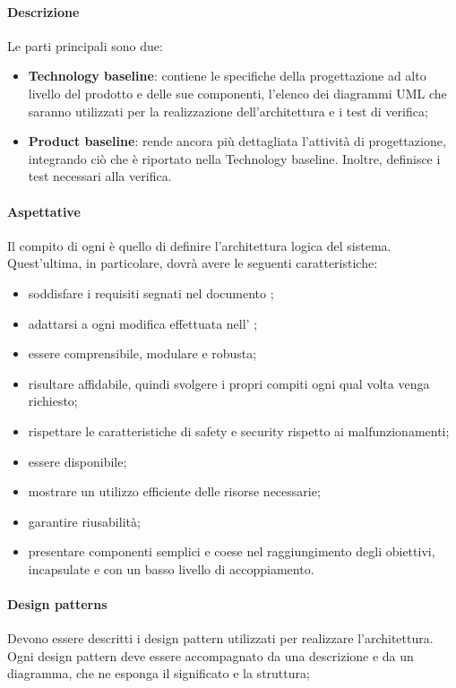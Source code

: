 \paragraph{Descrizione}
Le parti principali sono due:
\begin{itemize}
\item \textbf{Technology baseline}: contiene le specifiche della progettazione ad alto livello del prodotto e delle sue componenti, l'elenco dei diagrammi UML che saranno utilizzati per la realizzazione dell'architettura e i test di verifica;
\item \textbf{Product baseline}: rende ancora più dettagliata l'attività di progettazione, integrando ciò che è riportato nella Technology baseline. Inoltre, definisce i test necessari alla verifica.
\end{itemize}
\paragraph{Aspettative}
Il compito di ogni \prog{} è quello di definire l'architettura logica del sistema. Quest'ultima, in particolare, dovrà avere le seguenti caratteristiche:
\begin{itemize}
\item soddisfare i requisiti segnati nel documento \AdR{};
\item adattarsi a ogni modifica effettuata nell' \AdR{};
\item essere comprensibile, modulare e robusta;
\item risultare affidabile, quindi svolgere i propri compiti ogni qual volta venga richiesto;
\item rispettare le caratteristiche di safety e security rispetto ai malfunzionamenti;
\item essere disponibile;
\item mostrare un utilizzo efficiente delle risorse necessarie;
\item garantire riusabilità;
\item presentare componenti semplici e coese nel raggiungimento degli obiettivi, incapsulate e con un basso livello di accoppiamento.
\end{itemize}
\paragraph{Design patterns}
Devono essere descritti i design pattern utilizzati per realizzare l'architettura. Ogni design pattern deve essere accompagnato da una descrizione e da un diagramma, che ne esponga il significato e la struttura;
